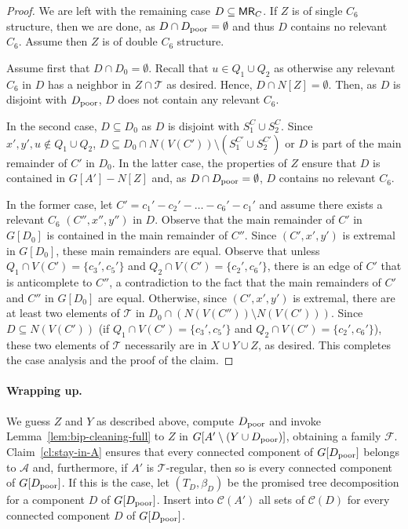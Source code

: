 \documentclass[11pt,a4paper]{article}
\theoremstyle{definition}
\def\T{\mathcal{T}}
\begin{document}
\begin{proof}
    We are left with the remaining case $D \subseteq \mathsf{MR}_C$. 
    If $Z$ is of single $C_6$ structure, then we are done, as $D \cap D_{\mathrm{poor}} = \emptyset$
    and thus $D$ contains no relevant $C_6$. 
    Assume then $Z$ is of double $C_6$ structure. 
    
    Assume first that $D \cap D_0 = \emptyset$.
    Recall that $u \in Q_1 \cup Q_2$ as otherwise
    any relevant $C_6$ in $D$ has a neighbor in $Z \cap \T$ as desired.
    Hence, $D \cap N[Z] = \emptyset$. Then, as $D$ is disjoint with $D_{\mathrm{poor}}$,
    $D$ does not contain any relevant $C_6$. 

    In the second case, $D \subseteq D_0$ as $D$ is disjoint with $S_1^C \cup S_2^C$. 
    Since $x',y',u \notin Q_1 \cup Q_2$, $D \subseteq D_0 \cap N(V(C')) \setminus (S_1^{C'} \cup S_2^{C'})$ or $D$ is part of the main remainder of $C'$ in $D_0$. 
    In the latter case, the properties of $Z$ ensure that $D$ is contained in $G[A']-N[Z]$ and,
    as $D \cap D_{\mathrm{poor}} = \emptyset$, $D$ contains no relevant $C_6$. 

    In the former case, let $C' = c_1'-c_2'-\ldots-c_6'-c_1'$
    and assume there exists a relevant $C_6$ $(C'',x'',y'')$ in $D$. 
    Observe that the main remainder of $C'$ in $G[D_0]$ is contained in the main remainder
    of $C''$. Since $(C',x',y')$ is extremal in $G[D_0]$, these main remainders are equal.
    Observe that unless $Q_1 \cap V(C') = \{c_3', c_5'\}$ and $Q_2 \cap V(C') = \{c_2',c_6'\}$,
    there is an edge of $C'$ that is anticomplete to $C''$, a contradiction to the
    fact that the main remainders of $C'$ and $C''$ in $G[D_0]$ are equal.
    Otherwise, since $(C',x',y')$ is extremal, there are at least two elements of $\T$
    in $D_0 \cap (N(V(C'')) \setminus N(V(C')))$. Since $D \subseteq N(V(C'))$
    (if $Q_1 \cap V(C') = \{c_3', c_5'\}$ and $Q_2 \cap V(C') = \{c_2',c_6'\}$), 
    these two elements of $\T$ necessarily are in $X \cup Y \cup Z$, as desired. 
    This completes the case analysis and the proof of the claim.
\end{proof}


\paragraph{Wrapping up.}
We guess $Z$ and $Y$ as described above, compute $D_{\mathrm{poor}}$ and 
invoke Lemma~\ref{lem:bip-cleaning-full} to $Z$ in $G[A' \setminus (Y \cup D_{\mathrm{poor}})]$,
obtaining a family $\mathcal{F}$. 
Claim~\ref{cl:stay-in-A} ensures that every connected component of $G[D_{\mathrm{poor}}]$ belongs to $\mathcal{A}$ and, furthermore, if $A'$ is $\T$-regular, then so is every connected
component of $G[D_{\mathrm{poor}}]$.
If this is the case, let $(T_D,\beta_D)$ be the promised tree decomposition for 
a component $D$ of $G[D_{\mathrm{poor}}]$. 
Insert into $\mathcal{C}(A')$ 
all sets of $\mathcal{C}(D)$ for every
connected component $D$ of $G[D_{\mathrm{poor}}]$.
\end{document}
